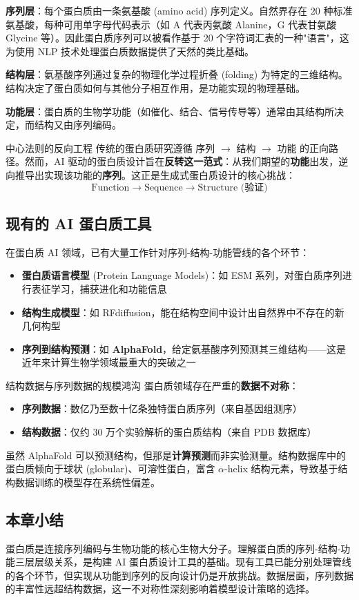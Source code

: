 \textbf{序列层}：每个蛋白质由一条氨基酸 (amino acid) 序列定义。自然界存在 20 种标准氨基酸，每种可用单字母代码表示（如 A 代表丙氨酸 Alanine，G 代表甘氨酸 Glycine 等）。因此蛋白质序列可以被看作基于 20 个字符词汇表的一种"语言"，这为使用 NLP 技术处理蛋白质数据提供了天然的类比基础。

\textbf{结构层}：氨基酸序列通过复杂的物理化学过程折叠 (folding) 为特定的三维结构。结构决定了蛋白质如何与其他分子相互作用，是功能实现的物理基础。

\textbf{功能层}：蛋白质的生物学功能（如催化、结合、信号传导等）通常由其结构所决定，而结构又由序列编码。

\begin{importantbox}{中心法则的反向工程}
传统的蛋白质研究遵循 序列 $\rightarrow$ 结构 $\rightarrow$ 功能 的正向路径。然而，AI 驱动的蛋白质设计旨在\textbf{反转这一范式}：从我们期望的\textbf{功能}出发，逆向推导出实现该功能的\textbf{序列}。这正是生成式蛋白质设计的核心挑战：
$$\text{Function} \rightarrow \text{Sequence} \rightarrow \text{Structure (验证)}$$
\end{importantbox}

\subsection{现有的 AI 蛋白质工具}

在蛋白质 AI 领域，已有大量工作针对序列-结构-功能管线的各个环节：

\begin{itemize}
    \item \textbf{蛋白质语言模型} (Protein Language Models)：如 ESM 系列，对蛋白质序列进行表征学习，捕获进化和功能信息
    \item \textbf{结构生成模型}：如 RFdiffusion，能在结构空间中设计出自然界中不存在的新几何构型
    \item \textbf{序列到结构预测}：如 \textbf{AlphaFold}，给定氨基酸序列预测其三维结构——这是近年来计算生物学领域最重大的突破之一
\end{itemize}

\begin{warningbox}{结构数据与序列数据的规模鸿沟}
蛋白质领域存在严重的\textbf{数据不对称}：
\begin{itemize}
    \item \textbf{序列数据}：数亿乃至数十亿条独特蛋白质序列（来自基因组测序）
    \item \textbf{结构数据}：仅约 30 万个实验解析的蛋白质结构（来自 PDB 数据库）
\end{itemize}
虽然 AlphaFold 可以预测结构，但那是\textbf{计算预测}而非实验测量。结构数据库中的蛋白质倾向于球状 (globular)、可溶性蛋白，富含 $\alpha$-helix 结构元素，导致基于结构数据训练的模型存在系统性偏差。
\end{warningbox}

\subsection{本章小结}

蛋白质是连接序列编码与生物功能的核心生物大分子。理解蛋白质的序列-结构-功能三层层级关系，是构建 AI 蛋白质设计工具的基础。现有工具已能分别处理管线的各个环节，但实现从功能到序列的反向设计仍是开放挑战。数据层面，序列数据的丰富性远超结构数据，这一不对称性深刻影响着模型设计策略的选择。


